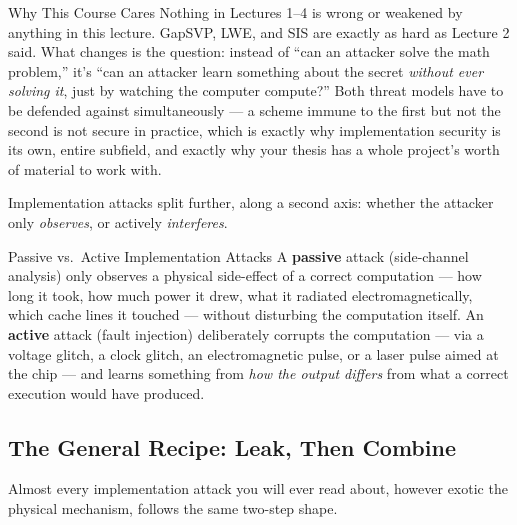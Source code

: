 \begin{rmkbox}{Why This Course Cares}
Nothing in Lectures 1--4 is wrong or weakened by anything in this lecture. GapSVP, LWE, and SIS are exactly as hard as Lecture 2 said. What changes is the question: instead of ``can an attacker solve the math problem,'' it's ``can an attacker learn something about the secret \emph{without ever solving it}, just by watching the computer compute?'' Both threat models have to be defended against simultaneously --- a scheme immune to the first but not the second is not secure in practice, which is exactly why implementation security is its own, entire subfield, and exactly why your thesis has a whole project's worth of material to work with.
\end{rmkbox}

Implementation attacks split further, along a second axis: whether the attacker only \emph{observes}, or actively \emph{interferes}.

\begin{defbox}{Passive vs.\ Active Implementation Attacks}
A \textbf{passive} attack (side-channel analysis) only observes a physical side-effect of a correct computation --- how long it took, how much power it drew, what it radiated electromagnetically, which cache lines it touched --- without disturbing the computation itself. An \textbf{active} attack (fault injection) deliberately corrupts the computation --- via a voltage glitch, a clock glitch, an electromagnetic pulse, or a laser pulse aimed at the chip --- and learns something from \emph{how the output differs} from what a correct execution would have produced.
\end{defbox}

\subsection{The General Recipe: Leak, Then Combine}
\label{sec:L5:the-general-recipe-leak-then-combine}

Almost every implementation attack you will ever read about, however exotic the physical mechanism, follows the same two-step shape.

